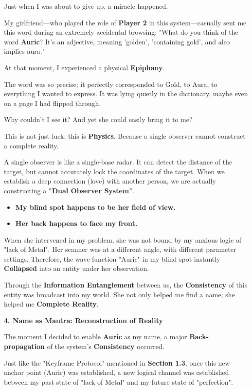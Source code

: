 Just when I was about to give up, a miracle happened.

My girlfriend—who played the role of \textbf{Player 2} in this system—casually sent me this word during an extremely accidental browsing: "What do you think of the word \textbf{Auric}? It's an adjective, meaning 'golden', 'containing gold', and also implies aura."

At that moment, I experienced a physical \textbf{Epiphany}.

The word was so precise; it perfectly corresponded to Gold, to Aura, to everything I wanted to express. It was lying quietly in the dictionary, maybe even on a page I had flipped through.

Why couldn't I see it? And yet she could easily bring it to me?

This is not just luck; this is \textbf{Physics}. Because a single observer cannot construct a complete reality.

A single observer is like a single-base radar. It can detect the distance of the target, but cannot accurately lock the coordinates of the target. When we establish a deep connection (love) with another person, we are actually constructing a \textbf{"Dual Observer System"}.

\begin{itemize}
\item \textbf{My blind spot happens to be her field of view.}
\item \textbf{Her back happens to face my front.}
\end{itemize}

When she intervened in my problem, she was not bound by my anxious logic of "lack of Metal". Her scanner was at a different angle, with different parameter settings. Therefore, the wave function "Auric" in my blind spot instantly \textbf{Collapsed} into an entity under her observation.

Through the \textbf{Information Entanglement} between us, the \textbf{Consistency} of this entity was broadcast into my world. She not only helped me find a name; she helped me \textbf{Complete Reality}.

\textbf{4. Name as Mantra: Reconstruction of Reality}

The moment I decided to enable \textbf{Auric} as my name, a major \textbf{Back-propagation} of the system's \textbf{Consistency} occurred.

Just like the "Keyframe Protocol" mentioned in \textbf{Section 1.3}, once this new anchor point (Auric) was established, a new logical channel was established between my past state of "lack of Metal" and my future state of "perfection".

